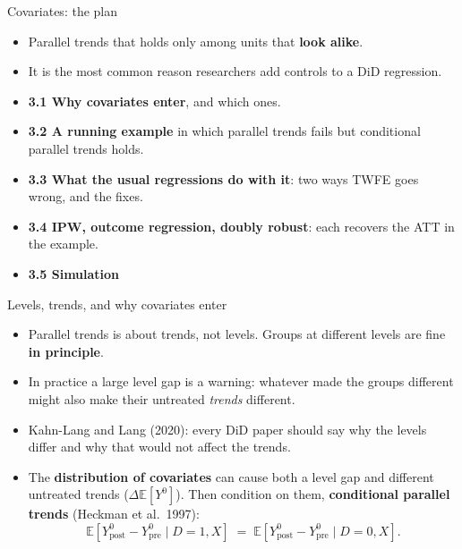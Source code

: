 \documentclass[
  11pt,
  ignorenonframetext,
  aspectratio=169,
]{beamer}
\providecommand{\tightlist}{%
  \setlength{\itemsep}{0pt}\setlength{\parskip}{0pt}}
\begin{document}
\begin{frame}{Covariates: the plan}
\protect{}\label{covariates-the-plan}
\begin{itemize}
\tightlist
\item
  Parallel trends that holds only among units that \textbf{look alike}.
\item
  It is the most common reason researchers add controls to a DiD
  regression.
\end{itemize}

\vspace{0.4em}

\begin{itemize}
\tightlist
\item
  \textbf{3.1 Why covariates enter}, and which ones.
\item
  \textbf{3.2 A running example} in which parallel trends fails but
  conditional parallel trends holds.
\item
  \textbf{3.3 What the usual regressions do with it}: two ways TWFE goes
  wrong, and the fixes.
\item
  \textbf{3.4 IPW, outcome regression, doubly robust}: each recovers the
  ATT in the example.
\item
  \textbf{3.5 Simulation}
\end{itemize}
\end{frame}

\begin{frame}{Levels, trends, and why covariates enter}
\protect{}\label{levels-trends-and-why-covariates-enter}
\begin{itemize}
\tightlist
\item
  Parallel trends is about trends, not levels. Groups at different
  levels are fine \textbf{in principle}.
\item
  In practice a large level gap is a warning: whatever made the groups
  different might also make their untreated \emph{trends} different.
\item
  Kahn-Lang and Lang (2020): every DiD paper should say why the levels
  differ and why that would not affect the trends.
\item
  The \textbf{distribution of covariates} can cause both a level gap and
  different untreated trends (\(\Delta \mathbb{E}[Y^0]\)). Then
  condition on them, \textbf{conditional parallel trends} (Heckman et
  al.~1997): \[
  \mathbb{E}[Y^0_{\text{post}} - Y^0_{\text{pre}} \mid D=1, X] \;=\; \mathbb{E}[Y^0_{\text{post}} - Y^0_{\text{pre}} \mid D=0, X].
  \]
\end{itemize}
\end{frame}
\end{document}
